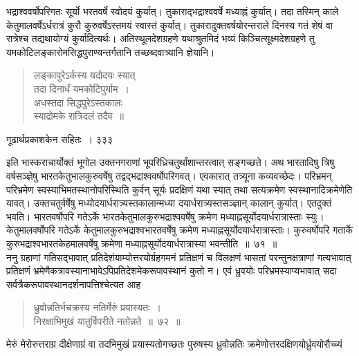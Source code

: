 \documentclass[11pt, openany]{book}
\begin{document}
 भद्राश्ववर्षोपरिगतः सूर्यो भरतवर्षे स्वोदयं कुर्यात्। तुकाराद्भद्राश्ववर्षे मध्याह्नं कुर्यात्। तदा तस्मिन् काले केतुमालवर्षेऽर्धरात्रं कुरौ कुरुवर्षेऽस्तमयं स्वास्तं कुर्यात्। तुकारादुक्तवर्षयोरन्तराले दिनस्य गतं शेषं वा रात्रेश्च तद्यथायोग्यं कुर्यादित्यर्थः। अतिस्थूलदेशग्रहणे यथाश्रुतमिदं भव्यं किञ्चित्सूक्ष्मदेशग्रहणे तु यमकोटिलङ्कारोमसिद्धपुराण्यन्तर्गतानि तच्छब्दवात्र्यानि ज्ञेयानि। 


\begin{quote}
{\qt लङ्कापुरेऽर्कस्य यदोदयः स्यात् \\
तदा दिनार्धं यमकोटिपुर्याम~।\\
अधस्तदा सिद्धपुरेऽस्तकालः \\
स्याद्रोमके रात्रिदलं तदैव~॥}
%
\end{quote}

\newpage


\hspace{3cm} गूढार्थप्रकाशकेन सहितः~। \hfill ३३३ 
\vspace{1cm}

%
\noindent इति भास्कराचार्योक्तं भूगोल उक्तनगराणां भूपरिध्रिचतुर्थांशान्तरत्वात् सङ्गच्छते। अथ भारतादिषु त्रिषु वर्षसञ्ज्ञेषु भारतकेतुभालकुरुवर्षेषु तद्वद्भद्राश्ववर्षोपरिगवत्। एवकारात् तत्र्यूना कव्यवच्छेदः। परिभ्रमन् परिभ्रमेण स्वस्याभिमतस्थानोपरिस्थिति कुर्वन् सूर्यः प्रदक्षिणं यथा स्यात् तथा सत्यक्रमेण स्वस्थानादिक्रमेणेति यावत्। उक्तचतुर्वर्षेषु मध्योदयार्धरात्र्यस्तकालान्मध्या दयार्धरात्र्यस्तसञ्ज्ञान् कालान् कुर्यात्। एतदुक्तं भवति। भारतवर्षोपरि गतेऽर्के भारतकेतुमालकुरुभद्राश्ववर्षेषु क्रमेण मध्याह्नसूर्योदयार्धरात्रास्ताः स्युः। केतुमालवर्षोपरि गतेऽर्के केतुमालकुरुभद्राश्वभारतवर्षेषु क्रमेण मध्याह्नसूर्योदयार्धरात्रास्ताः। कुरुवर्षोपरि गतार्के कुरुभद्राश्वभारतकेहमालवर्षेषु क्रमेणा मध्याह्नसूर्योदयार्धरात्रास्या भवन्तीति~॥~७१~॥ \\
\noindent ननु ग्रहाणां गतिसद्भावात् प्रतिदेशंयाम्योत्तरयोर्ग्रहगमनं प्रतिक्षणं च विलक्षणं भासतां परन्तुनक्षत्राणां गत्यभावात् प्रतिक्षणं भ्रमेणैकत्रावस्यानाभावेऽपिप्रतिदेशमेकरूपावस्थानं कुतो न। एवं ध्रुवयोः परिभ्रमस्याप्यभावात् सदा सर्वत्रैकरूपावस्थानदर्शनापत्तिश्चेत्यत आह \textendash


 \begin{quote}
{\ssi ध्रुवोन्नतिर्भचक्रस्य नतिर्मेरुं प्रयास्यतः~।\\
निरक्षाभिमुखं यातुर्विपरीते नतोन्नते~॥~७२~॥}
\end{quote}
\noindent मेरुं मेरोरुत्तराग्र दीक्षेणाग्रं वा तदभिमुखं प्रयास्यतोगच्छतः पुरुषस्य ध्रुवोन्नतिः क्रमेणोत्तरदक्षिणयोर्ध्रुवयोरौच्च्यं \textendash
%
\end{document}
